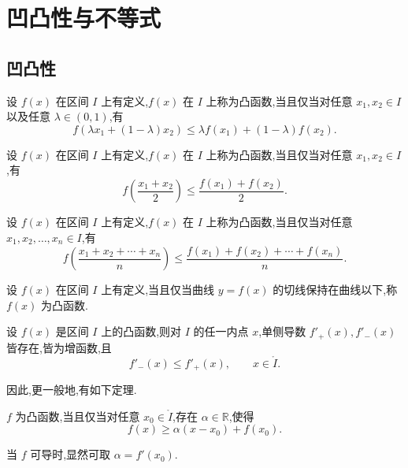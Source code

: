 \newpage

\section{凹凸性与不等式}


\subsection{凹凸性}

\begin{definition}
    设 $f(x)$ 在区间 $I$ 上有定义,$f(x)$ 在 $I$ 上称为凸函数,当且仅当对任意 $x_1,x_2\in I$ 以及任意 $\lambda\in(0,1)$,有
    \[
        f(\lambda x_1+(1-\lambda)x_2)
        \leq\lambda f(x_1)+(1-\lambda)f(x_2).
    \]
\end{definition}

\begin{definition}
    设 $f(x)$ 在区间 $I$ 上有定义,$f(x)$ 在 $I$ 上称为凸函数,当且仅当对任意 $x_1,x_2\in I$,有
    \[
        f\left(\dfrac{x_1+x_2}{2}\right)
        \leq\dfrac{f(x_1)+f(x_2)}{2}.
    \]
\end{definition}

\begin{definition}
    设 $f(x)$ 在区间 $I$ 上有定义,$f(x)$ 在 $I$ 上称为凸函数,当且仅当对任意 $x_1,x_2,\ldots,x_n\in I$,有
    \[
        f\left(\dfrac{x_1+x_2+\cdots+x_n}{n}\right)
        \leq\dfrac{f(x_1)+f(x_2)+\cdots+f(x_n)}{n}.
    \]
\end{definition}

\begin{definition}
    设 $f(x)$ 在区间 $I$ 上有定义,当且仅当曲线 $y=f(x)$ 的切线保持在曲线以下,称 $f(x)$ 为凸函数.
\end{definition}

\begin{lemma}[\markstar]
    设 $f(x)$ 是区间 $I$ 上的凸函数,则对 $I$ 的任一内点 $x$,单侧导数 $f'_+(x),f'_-(x)$ 皆存在,皆为增函数,且
    \[
        f'_-(x)\leq f'_+(x),
        \qquad x\in\mathring I.
    \]
\end{lemma}

因此,更一般地,有如下定理.

\begin{theorem}[\markstar]
    $f$ 为凸函数,当且仅当对任意 $x_0\in\mathring I$,存在 $\alpha\in\mathbb{R}$,使得
    \[
        f(x)\geq\alpha(x-x_0)+f(x_0).
    \]
\end{theorem}

\begin{remark}
    当 $f$ 可导时,显然可取 $\alpha=f'(x_0)$.
\end{remark}

